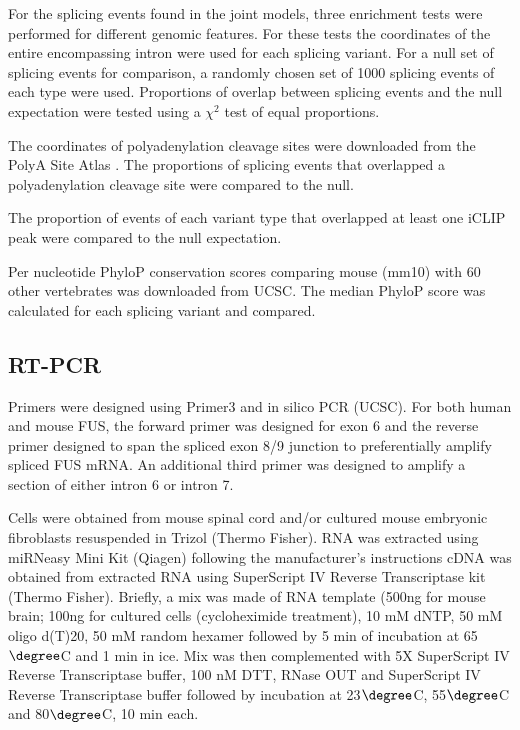 For the splicing events found in the joint models, three enrichment tests were performed for different genomic features. 
For these tests the coordinates of the entire encompassing intron were used for each splicing variant.
For a null set of splicing events for comparison, a randomly chosen set of 1000 splicing events of each type were used.
Proportions of overlap between splicing events and the null expectation were tested using a $\chi^2$ test of equal proportions.

The coordinates of polyadenylation cleavage sites were downloaded from the PolyA Site Atlas \citep{Gruber2016}. 
The proportions of  splicing events that overlapped a polyadenylation cleavage site were compared to the null.

The proportion of events of each variant type that overlapped at least one iCLIP peak  were compared to the null expectation.

Per nucleotide PhyloP conservation scores \citep{Pollard2010-fj} comparing mouse (mm10) with 60 other vertebrates was downloaded from UCSC. 
The median PhyloP score was calculated for each splicing variant and compared.

\subsection{RT-PCR}
Primers were designed using Primer3 \citep{Koressaar2007} and in silico PCR (UCSC). 
For both human and mouse FUS, the forward primer was designed for exon 6 and the reverse primer designed to span the spliced exon 8/9 junction to preferentially amplify spliced FUS mRNA. 
An additional third primer was designed to amplify a section of either intron 6 or intron 7.

Cells were obtained from mouse spinal cord and/or cultured mouse embryonic fibroblasts resuspended in Trizol (Thermo Fisher). 
RNA was extracted using miRNeasy Mini Kit (Qiagen) following the manufacturer's instructions %
cDNA was obtained from extracted RNA using SuperScript IV Reverse Transcriptase kit (Thermo Fisher). 
Briefly, a mix was made of RNA template (500ng for mouse brain; 100ng for cultured cells (cycloheximide treatment), 10 mM dNTP, 50 mM oligo d(T)20, 50 mM random hexamer followed by 5 min of incubation at 65$\degree$C and 1 min in ice. Mix was then complemented with 5X SuperScript IV Reverse Transcriptase buffer, 100 nM DTT, RNase OUT and SuperScript IV Reverse Transcriptase buffer followed by incubation at 23$\degree$C, 55$\degree$C and 80$\degree$C, 10 min each. 

